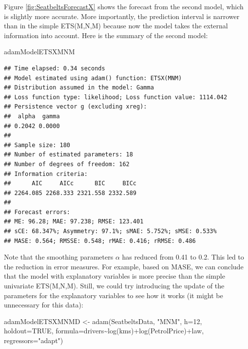 \documentclass[
]{book}
\newenvironment{Shaded}{\begin{snugshade}}{\end{snugshade}}
\newcommand{\AttributeTok}[1]{\textcolor[rgb]{0.77,0.63,0.00}{#1}}
\newcommand{\ConstantTok}[1]{\textcolor[rgb]{0.00,0.00,0.00}{#1}}
\newcommand{\DecValTok}[1]{\textcolor[rgb]{0.00,0.00,0.81}{#1}}
\newcommand{\FunctionTok}[1]{\textcolor[rgb]{0.00,0.00,0.00}{#1}}
\newcommand{\NormalTok}[1]{#1}
\newcommand{\OtherTok}[1]{\textcolor[rgb]{0.56,0.35,0.01}{#1}}
\newcommand{\SpecialCharTok}[1]{\textcolor[rgb]{0.00,0.00,0.00}{#1}}
\newcommand{\StringTok}[1]{\textcolor[rgb]{0.31,0.60,0.02}{#1}}
\theoremstyle{definition}
\theoremstyle{definition}
\theoremstyle{definition}
\theoremstyle{definition}
\theoremstyle{remark}
\begin{document}
Figure \ref{fig:SeatbeltsForecastX} shows the forecast from the second model, which is slightly more accurate. More importantly, the prediction interval is narrower than in the simple ETS(M,N,M) because now the model takes the external information into account. Here is the summary of the second model:

\begin{Shaded}
\begin{Highlighting}[]
\NormalTok{adamModelETSXMNM}
\end{Highlighting}
\end{Shaded}

\begin{verbatim}
## Time elapsed: 0.34 seconds
## Model estimated using adam() function: ETSX(MNM)
## Distribution assumed in the model: Gamma
## Loss function type: likelihood; Loss function value: 1114.042
## Persistence vector g (excluding xreg):
##  alpha  gamma 
## 0.2042 0.0000 
## 
## Sample size: 180
## Number of estimated parameters: 18
## Number of degrees of freedom: 162
## Information criteria:
##      AIC     AICc      BIC     BICc 
## 2264.085 2268.333 2321.558 2332.589 
## 
## Forecast errors:
## ME: 96.28; MAE: 97.238; RMSE: 123.401
## sCE: 68.347%; Asymmetry: 97.1%; sMAE: 5.752%; sMSE: 0.533%
## MASE: 0.564; RMSSE: 0.548; rMAE: 0.416; rRMSE: 0.486
\end{verbatim}

Note that the smoothing parameters \(\alpha\) has reduced from 0.41 to 0.2. This led to the reduction in error measures. For example, based on MASE, we can conclude that the model with explanatory variables is more precise than the simple univariate ETS(M,N,M). Still, we could try introducing the update of the parameters for the explanatory variables to see how it works (it might be unnecessary for this data):

\begin{Shaded}
\begin{Highlighting}[]
\NormalTok{adamModelETSXMNMD }\OtherTok{\textless{}{-}} \FunctionTok{adam}\NormalTok{(SeatbeltsData, }\StringTok{"MNM"}\NormalTok{, }\AttributeTok{h=}\DecValTok{12}\NormalTok{, }\AttributeTok{holdout=}\ConstantTok{TRUE}\NormalTok{,}
                          \AttributeTok{formula=}\NormalTok{drivers}\SpecialCharTok{\textasciitilde{}}\FunctionTok{log}\NormalTok{(kms)}\SpecialCharTok{+}\FunctionTok{log}\NormalTok{(PetrolPrice)}\SpecialCharTok{+}\NormalTok{law,}
                          \AttributeTok{regressors=}\StringTok{"adapt"}\NormalTok{)}
\end{Highlighting}
\end{Shaded}
\end{document}
